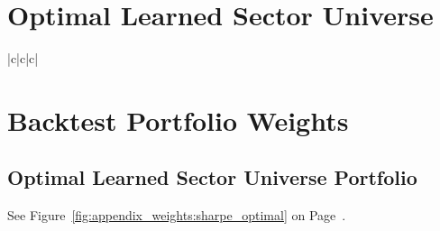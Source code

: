 \documentclass[../main.tex]{subfiles}
\begin{document}
\twocolumn
\chapter{Optimal Learned Sector Universe} \label{appendix:optimal_ls}

%

\begin{center}
    \tabletail{\midrule}
    \tablelasttail{\bottomrule}
    \begin{supertabular}{|c|c|c|}
    \end{supertabular}
\end{center}



\onecolumn

\chapter{Backtest Portfolio Weights} \label{appendix:portfolio_weights}

\section*{Optimal Learned Sector Universe Portfolio}

See Figure~\ref{fig:appendix_weights:sharpe_optimal} on Page~\pageref{fig:appendix_weights:sharpe_optimal}.
\end{document}
